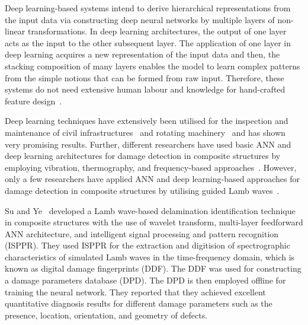 Deep learning-based systems intend to derive hierarchical representations
from the input data via constructing deep neural networks by multiple layers
of non-linear transformations.
In deep learning architectures, the output of one layer acts as the input to the other subsequent layer.
The application of one layer in deep learning acquires a new representation of the input data and then, the stacking composition of many layers enables the model to learn complex patterns from the simple notions that can be formed from raw input.
Therefore, these systems do not need extensive human labour and knowledge for hand-crafted feature design~\cite{zhao2019deep, yuan2020machine}.

Deep learning techniques have extensively been utilised for the inspection and
maintenance of civil infrastructures~\cite{cha2017deep, lin2017structural, liu2019computer} and rotating machinery~\cite{janssens2016convolutional, jia2016deep} and has shown very promising results.
Further, different researchers have used basic ANN and deep learning architectures for damage detection in composite structures by employing vibration, thermography, and frequency-based approaches~\cite{islam1994damage, okafor1996delamination, chakraborty2005artificial, khan2019structural, luo2019temporal, bang2020defect}. 
However, only a few researchers have applied ANN and deep learning-based approaches for damage detection in composite structures by utilising guided Lamb waves~\cite{su2004lamb, chetwynd2008damage, de2015application, feng2019locating, mardanshahi2020detection, qian2020application, tabian2019convolutional, rautela2021ultrasonic}.

Su and Ye~\cite{su2004lamb} developed a Lamb wave-based delamination identification technique in composite structures with the use of wavelet transform, multi-layer feedforward ANN architecture, and intelligent signal processing and pattern recognition (ISPPR).
They used ISPPR for the extraction and digitision of spectrographic characteristics of simulated Lamb waves in the time-frequency domain, which is known as digital damage fingerprints (DDF).
The DDF was used for constructing a damage parameters database (DPD). 
The DPD is then employed offline for training the neural network.  
They reported that they achieved excellent quantitative diagnosis results for different damage parameters such as the presence, location, orientation, and geometry of defects.

